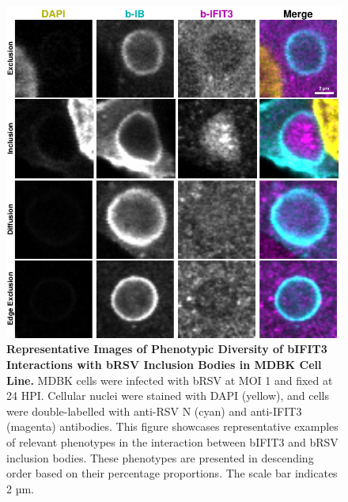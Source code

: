 \begin{figure}
    \centering
    \includegraphics[width=1\linewidth]{08. Chapter 3/Figs/02. Infection/03. IFIT3/09. mdbk i3.pdf}
    \caption[Representative Images of Phenotypic Diversity of bIFIT3 Interactions with bRSV Inclusion Bodies in MDBK Cell Line.]{\textbf{Representative Images of Phenotypic Diversity of bIFIT3 Interactions with bRSV Inclusion Bodies in MDBK Cell Line.} MDBK cells were infected with bRSV at MOI 1 and fixed at 24 HPI. Cellular nuclei were stained with DAPI (yellow), and cells were double-labelled with anti-RSV N (cyan) and anti-IFIT3 (magenta) antibodies. This figure showcases representative examples of relevant phenotypes in the interaction between bIFIT3 and bRSV inclusion bodies. These phenotypes are presented in descending order based on their percentage proportions. The scale bar indicates 2 µm.}
    \label{fig:Representative Images of Phenotypic Diversity of bIFIT3 Interactions with bRSV Inclusion Bodies in MDBK Cell Line}
\end{figure}

